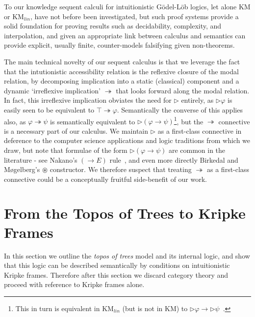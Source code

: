 \documentclass[envcountsect,envcountsame]{llncs}
\newcommand{\iimp}{\twoheadrightarrow}
\newcommand{\lcnxt}{\mathrm{KM}_{lin}}
\newcommand{\lgkm}{\mathrm{KM}}
\newcommand{\limp}{\rightarrow}
\newcommand{\nxt}{\rhd}
\begin{document}
To our knowledge sequent calculi for intuitionistic G\"odel-L\"ob logics, let alone $\lgkm$
or $\lcnxt$, have not before been investigated, but such proof systems provide a
solid foundation for proving results such as decidability, complexity, and
interpolation, and given an appropriate link between calculus and
semantics can provide explicit, usually finite, counter-models falsifying given non-theorems.

The main technical novelty of our sequent calculus is that we leverage the fact that the
intutionistic accessibility relation is the reflexive closure of the modal relation, by
decomposing implication into a static (classical)
component and a dynamic `irreflexive implication' $\iimp$ that looks forward along the modal relation. In fact, this irreflexive
implication obviates the need for $\nxt$ entirely, as $\nxt\varphi$ is easily seen to be equivalent to $\top\iimp\varphi$. Semantically
the converse of this applies also, as $\varphi\iimp\psi$ is semantically equivalent to $\nxt(\varphi\limp\psi)$\footnote{This in turn is equivalent in $\lcnxt$ (but is not in
  $\lgkm$) to $\nxt\varphi\limp\nxt\psi$~\cite[Sec. 3]{Nakano:Modality}.}, but the $\iimp$ connective is a necessary part of our calculus. We maintain $\nxt$ as a first-class connective in deference to
the computer science applications and logic traditions from which we draw, but note
that formulae of the form $\nxt(\varphi\limp\psi)$ are common in the literature - see Nakano's $(\limp E)$ rule~\cite{Nakano:Modality}, and even more directly Birkedal and
M{\o}gelberg's $\circledast$ constructor. We therefore suspect that treating $\iimp$
as a first-class connective could be a conceptually fruitful side-benefit of our work.



\section{From the Topos of Trees to Kripke Frames}\label{sec:trees}

In this section we outline the \emph{topos of trees} model and its internal logic, and
show that this logic can be described semantically by conditions on intuitionistic Kripke
frames.
Therefore after this section we discard category theory and proceed with reference to
Kripke frames alone.
\end{document}
